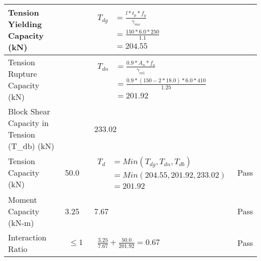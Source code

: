 \documentclass{article}%
\begin{document}
\begin{longtable}{|p{4cm}|p{5cm}|p{5.5cm}|p{1.5cm}|}
\hline%
Tension Yielding Capacity (kN)&&$\begin{aligned} T_{dg} &= \frac{l*t_p*f_y}{\gamma_{mo}}\\ &=\frac{150*6.0*250}{1.1}\\ &=204.55\end{aligned}$&\\%
\hline%
Tension Rupture Capacity (kN)&&$\begin{aligned} T_{dn} &= \frac{0.9*A_{n}*f_u}{\gamma_{m1}}\\ &=\frac{0.9*(150-2*18.0)*6.0*410}{1.25}\\ &=201.92\end{aligned}$&\\%
\hline%
Block Shear Capacity in Tension (T\_db) (kN)&&233.02&\\%
\hline%
Tension Capacity (kN)&50.0&$\begin{aligned} T_d &= Min(T_{dg},T_{dn},T_{db})\\ &= Min(204.55,201.92,233.02)\\ &=201.92\end{aligned}$&Pass\\%
\hline%
Moment Capacity (kN{-}m)&3.25&7.67&Pass\\%
\hline%
Interaction Ratio&$\begin{aligned} \leq1\end{aligned}$&$\begin{aligned} \frac{3.25}{7.67}+\frac{50.0}{201.92}=0.67\end{aligned}$&Pass\\%
\hline%
\end{longtable}

%
\newpage%
\end{document}
